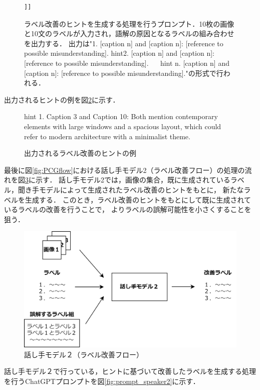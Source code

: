 \documentclass[a4paper,11pt]{jreport}
\begin{document}
\begin{figure}[h]
\begin{mdframed}
\begin{lstlisting}[style=chatgptstyle]
    ]]
  \end{lstlisting}
  \end{mdframed}
  \caption{ラベル改善のヒントを生成する処理を行うプロンプト．10枚の画像と10文のラベルが入力され，語解の原因となるラベルの組み合わせを出力する．
  出力は"1. [caption n] and [caption n]: [reference to possible misunderstanding]. hint2. [caption n] and [caption n]: [reference to possible misunderstanding]. ~~ hint n. [caption n] and [caption n]: [reference to possible misunderstanding]."の形式で行われる．}
  \label{fig:prompt_listener}
\end{figure}

出力されるヒントの例を図\ref{fig:hint_example}に示す．

\begin{figure}[H]
  \begin{mdframed}[linewidth=1pt]
    hint 1. Caption 3 and Caption 10: Both mention contemporary elements with large windows and a spacious layout, which could refer to modern architecture with a minimalist theme.
  \end{mdframed}
  \caption{出力されるラベル改善のヒントの例}
  \label{fig:hint_example}
\end{figure}

最後に図\ref{fig:PCGflow}における話し手モデル2（ラベル改善フロー）の処理の流れを図\ref{fig:PCGspeaker2}に示す．
話し手モデル2では，画像の集合，既に生成されているラベル，聞き手モデルによって生成されたラベル改善のヒントをもとに，
新たなラベルを生成する．
このとき，ラベル改善のヒントをもとにして既に生成されているラベルの改善を行うことで，
よりラベルの誤解可能性を小さくすることを狙う．

\begin{figure}[H]
	\centering
	\includegraphics[width=0.8\linewidth]{figures/PCGspeaker2.png}
	\caption{話し手モデル２（ラベル改善フロー）}
	\label{fig:PCGspeaker2}
\end{figure}

話し手モデル２で行っている，ヒントに基づいて改善したラベルを生成する処理を行うChatGPTプロンプトを図\ref{fig:prompt_speaker2}に示す．
\end{document}
